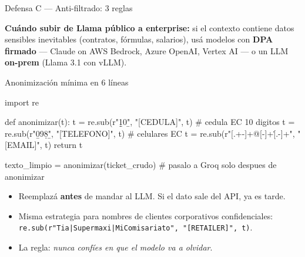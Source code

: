 \documentclass[aspectratio=169, 11pt]{beamer}
\begin{document}
\begin{frame}[shrink]{Defensa C --- Anti-filtrado: 3 reglas}
  \vspace{4pt}
  \begin{center}
  \end{center}
  \vspace{12pt}
  \begin{tcolorbox}[colback=arcaGray, colframe=arcaRed, leftrule=3pt,
    boxrule=0pt, sharp corners, left=8pt, right=8pt, top=4pt, bottom=4pt]
    {\footnotesize\color{arcaDark}
    \textbf{Cuándo subir de Llama público a enterprise:} si el contexto contiene
    datos sensibles inevitables (contratos, fórmulas, salarios), usá modelos con
    \textbf{DPA firmado} --- Claude on AWS Bedrock, Azure OpenAI, Vertex AI ---
    o un LLM \textbf{on-prem} (Llama 3.1 con vLLM).}
  \end{tcolorbox}
\end{frame}

\begin{frame}{Anonimización mínima en 6 líneas}
  \begin{pyblock}
import re

def anonimizar(t):
    t = re.sub(r"\b\d{10}\b", "[CEDULA]", t)        # cedula EC 10 digitos
    t = re.sub(r"\b09\d{8}\b", "[TELEFONO]", t)     # celulares EC
    t = re.sub(r"[\w.+-]+@[\w-]+\.[\w.-]+", "[EMAIL]", t)
    return t

texto_limpio = anonimizar(ticket_crudo)
# pasalo a Groq solo despues de anonimizar
  \end{pyblock}
  \vspace{4pt}
  \begin{itemize}\setlength{\itemsep}{3pt}
    \footnotesize
    \item Reemplazá \textbf{antes} de mandar al LLM. Si el dato sale del API, ya es tarde.
    \item Misma estrategia para nombres de clientes corporativos confidenciales:
    \texttt{re.sub(r"Tia|Supermaxi|Mi\textunderscore Comisariato", "[RETAILER]", t)}.
    \item La regla: \emph{nunca confíes en que el modelo va a olvidar}.
  \end{itemize}
\end{frame}
\end{document}
